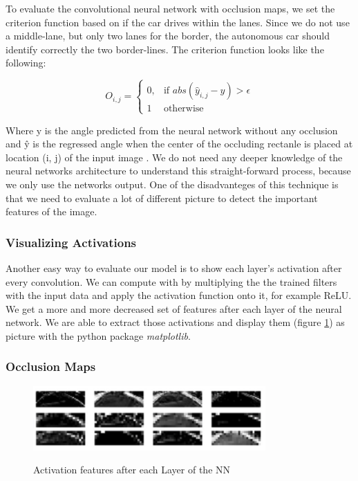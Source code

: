 \documentclass[journal]{IEEEtran}
\begin{document}
To evaluate the convolutional neural network with occlusion maps, we set the criterion function based on if the car drives within the lanes. Since we do not use a middle-lane, but only two lanes for the border, the autonomous car should identify correctly the two border-lines. The criterion function looks like the following:

\[
    O_{i,j}= 
\begin{cases}
    0,& \text{if } abs(\hat{y}_{i,j} - y) > \epsilon\\
    1              & \text{otherwise}
\end{cases}
\]

Where y is the angle predicted from the neural network without any occlusion and \^{y} is the regressed angle when the center of the occluding rectanle is placed at location (i, j) of the input image \cite{master}. We do not need any deeper knowledge of the neural networks architecture to understand this straight-forward process, because we only use the networks output. One of the disadvanteges of this technique is that we need to evaluate a lot of different picture to detect the important features of the image.

\subsubsection{Visualizing Activations}

Another easy way to evaluate our model is to show each layer's activation after every convolution. We can compute with by multiplying the the trained filters with the input data and apply the activation function onto it, for example ReLU. We get a more and more decreased set of features after each layer of the neural network. We are able to extract those activations and display them (figure \ref{activations}) as picture with the python package \textit{matplotlib}. 

\subsubsection{Occlusion Maps}
\begin{figure}
  \begin{center}
  \includegraphics[width=3.5in]{photo/activations.png}\\
  \caption{Activation features after each Layer of the NN  \cite{master} }\label{activations}
  \end{center}
\end{figure}
\end{document}
